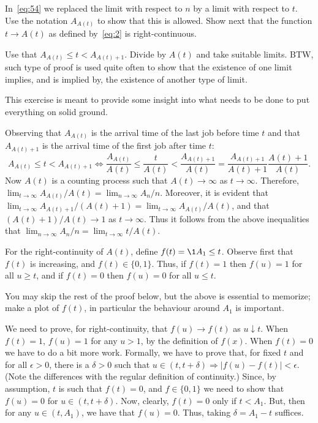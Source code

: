 \begin{extra}
 In~\cref{eq:54} we replaced the limit with respect to $n$ by a limit with respect to $t$.
 Use the notation $A_{A(t)}$ to show that this is allowed.
 Show next that the function $t\to A(t)$ as defined by~\cref{eq:2} is right-continuous.
\begin{hint}
 Use that $A_{A(t)} \leq t < A_{A(t)+1}$.
 Divide by $A(t)$ and take suitable limits.
 BTW, such type of proof is used quite often to show that the existence of one limit implies, and is implied by, the existence of another type of limit.
\end{hint}
\begin{solution}
 This exercise is meant to provide some insight into what needs to be done to put everything on solid ground.


 Observing that $A_{A(t)}$ is the arrival time of the last job before time $t$ and that $A_{A(t)+1}$ is the arrival time of the first job after time $t$:
 \begin{equation*}
 A_{A(t)} \leq t < A_{A(t)+1} \Leftrightarrow 
 \frac{A_{A(t)}} {A(t)} \leq \frac{t}{A(t)} <\frac{A_{A(t)+1}}{A(t)} = \frac{A_{A(t)+1}}{A(t)+1}\frac{A(t)+1}{A(t)}.
 \end{equation*}
 Now $A(t)$ is a counting process such that $A(t)\to\infty$ as $t\to\infty$.
 Therefore, $\lim_{t\to\infty} A_{A(t)}/A(t) = \lim_{n\to\infty} A_n/n$.
 Moreover, it is evident that $\lim_{t\to\infty} A_{A(t)+1}/(A(t)+1) = \lim_{t\to\infty} A_{A(t)}/A(t)$, and that $(A(t)+1)/A(t)\to 1$ as $t\to\infty$.
 Thus it follows from the above inequalities that $\lim_{n\to\infty} A_n/n = \lim_{t\to\infty} t/A(t)$.
 
 For the right-continuity of $A(t)$, define $f(t) = \1{A_1 \leq t}$.
 Observe first that $f(t)$ is increasing, and $f(t)\in\{0,1\}$.
 Thus, if $f(t)=1$ then $f(u)=1$ for all $u\geq t$, and if $f(t)=0$ then $f(u) = 0$ for all $u\leq t$.

 You may skip the rest of the proof below, but the above is essential to memorize; make a plot of $f(t)$, in particular the behaviour around $A_1$ is important.

 We need to prove, for right-continuity, that $f(u)\to f(t) $ as $u\downarrow t$.
 When $f(t)=1$, $f(u)=1$ for any $u>1$, by the definition of $f(x)$.
 When $f(t)=0$ we have to do a bit more work.
 Formally, we have to prove that, for fixed $t$ and for all $\epsilon > 0$, there is a $\delta>0$ such that $u\in(t, t+\delta) \Rightarrow |f(u) -f(t)| < \epsilon$.
 (Note the differences with the regular definition of continuity.)
 Since, by assumption, $t$ is such that $f(t)=0$, and $f\in\{0,1\}$ we need to show that $f(u)=0$ for $u\in(t, t+\delta)$.
 Now, clearly, $f(t)=0$ only if $t < A_1$.
 But, then for any $u\in(t, A_1)$, we have that $f(u) = 0$.
 Thus, taking $\delta = A_1 - t$ suffices.


\end{solution}
\end{extra}

